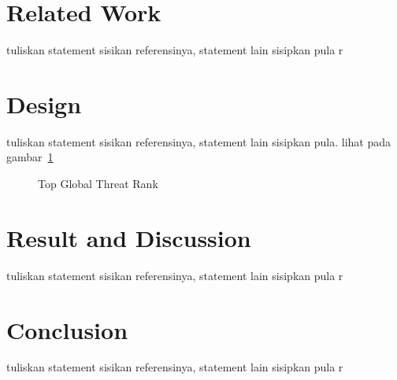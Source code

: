 \documentclass[conference]{IEEEtran}
\begin{document}
\section{Related Work}
tuliskan statement sisikan referensinya, statement lain sisipkan pula r

\section{Design}
tuliskan statement sisikan referensinya, statement lain sisipkan pula. lihat pada gambar~\ref{fig1}

\begin{figure}[ht!]
    \def\svgwidth{\columnwidth}
    
    \caption{Top Global Threat Rank}
    \label{fig1}
\end{figure}

\section{Result and Discussion}
tuliskan statement sisikan referensinya, statement lain sisipkan pula r

\section{Conclusion}
tuliskan statement sisikan referensinya, statement lain sisipkan pula r



\end{document}
